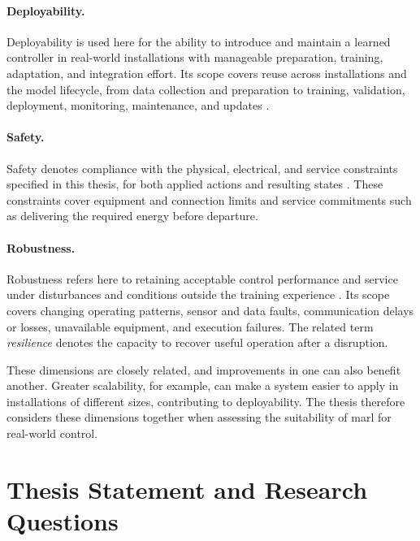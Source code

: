 \paragraph{Deployability.}
Deployability is used here for the ability to introduce and maintain a learned controller in real-world installations with manageable preparation, training, adaptation, and integration effort. Its scope covers reuse across installations \parencite{nweye2023merlin} and the model lifecycle, from data collection and preparation to training, validation, deployment, monitoring, maintenance, and updates \parencite{li2022rlops,kreuzberger2023mlops}.

\paragraph{Safety.}
Safety denotes compliance with the physical, electrical, and service constraints specified in this thesis, for both applied actions and resulting states \parencite{gu2023safemarl,elsayedaly2021shielding}. These constraints cover equipment and connection limits and service commitments such as delivering the required energy before departure.

\paragraph{Robustness.}
Robustness refers here to retaining acceptable control performance and service under disturbances and conditions outside the training experience \parencite{dulacarnold2021realworld}. Its scope covers changing operating patterns, sensor and data faults, communication delays or losses, unavailable equipment, and execution failures. The related term \emph{resilience} denotes the capacity to recover useful operation after a disruption.

\endgroup

\addvspace{1.2ex}
These dimensions are closely related, and improvements in one can also benefit another. Greater scalability, for example, can make a system easier to apply in installations of different sizes, contributing to deployability. The thesis therefore considers these dimensions together when assessing the suitability of \gls{marl} for real-world control.

\section{Thesis Statement and Research Questions}
\label{sec:intro-rqs}

